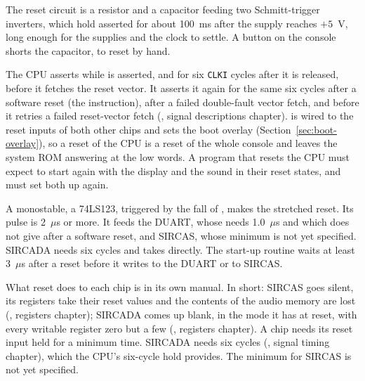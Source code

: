 The reset circuit is a resistor and a capacitor feeding two Schmitt-trigger inverters, which hold 
asserted for about 100~ms after the supply reaches $+5$~V, long enough for the supplies and the clock to settle. A
button on the console shorts the capacitor, to reset by hand.

The CPU asserts  while  is asserted, and for six \texttt{CLKI} cycles after it is
released, before it fetches the reset vector. It asserts it again for the same six cycles after a software reset (the
 instruction), after a failed double-fault vector fetch, and before it retries a failed reset-vector
fetch (\hwmanual{}, signal descriptions chapter).  is wired to the reset inputs of both other chips and
sets the boot overlay (Section~\ref{sec:boot-overlay}), so a reset of the CPU is a reset of the whole console and
leaves the system ROM answering at the low words. A program that resets the CPU must expect to start again with the
display and the sound in their reset states, and must set both up again.

A monostable, a 74LS123, triggered by the fall of , makes the stretched reset. Its pulse is 2~$\mu$s or
more. It feeds the DUART, whose  needs 1.0~$\mu$s and which  does not give after a
software reset, and SIRCAS, whose minimum is not yet specified. SIRCADA needs six cycles and takes 
directly. The start-up routine waits at least 3~$\mu$s after a reset before it writes to the DUART or to SIRCAS.

What reset does to each chip is in its own manual. In short: SIRCAS goes silent, its registers take their reset values
and the contents of the audio memory are lost (\audiomanual{}, registers chapter); SIRCADA comes up blank, in the mode
it has at reset, with every writable register zero but a few (\videomanual{}, registers chapter). A chip needs its
reset input held for a minimum time. SIRCADA needs six cycles (\videomanual{}, signal timing chapter), which the CPU's
six-cycle hold provides. The minimum for SIRCAS is not yet specified.
